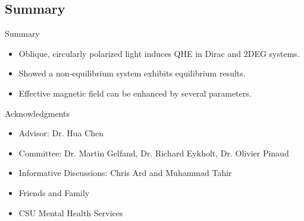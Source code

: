 \documentclass[xcolor=dvipsnames,10pt,aspectratio=169]{beamer}
\newcommand{\CO}{Summary}
\begin{document}
  \subsection{\CO}

  \begin{frame}{\CO}
    \begin{itemize}
      \item Oblique, circularly polarized light induces QHE in Dirac and 2DEG systems.
      \item Showed a non-equilibrium system exhibits equilibrium results.
      \item Effective magnetic field can be enhanced by several parameters.
    \end{itemize}
  \end{frame}


  \centering
  \begin{frame}{Acknowledgments}
    \vspace{2em}
    \begin{itemize}
      \item Advisor: Dr. Hua Chen
      \item Committee: Dr. Martin Gelfand, Dr. Richard Eykholt, Dr. Olivier Pinaud
      \item Informative Discussions: Chris Ard and Muhammad Tahir
      \item Friends and Family
      \item CSU Mental Health Services
    \end{itemize}
  \end{frame}

  \appendix
\end{document}

